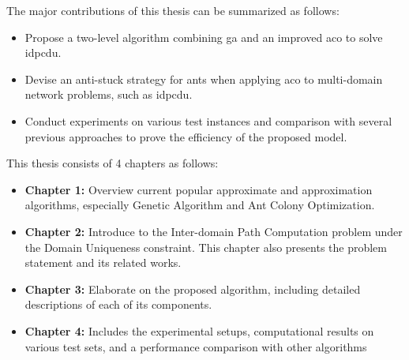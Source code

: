 The major contributions of this thesis can be summarized as follows:
\begin{itemize}
	\item Propose a two-level algorithm combining \gls{ga} and an improved \gls{aco} to solve \gls{idpcdu}.
	\item Devise an anti-stuck strategy for ants when applying \gls{aco} to multi-domain network problems, such as \gls{idpcdu}.
	\item Conduct experiments on various test instances and comparison with several previous approaches to prove the efficiency of the proposed model.
\end{itemize}

This thesis consists of 4 chapters as follows:
\begin{itemize}
	\item \textbf{Chapter 1:} Overview current popular approximate and approximation algorithms, especially Genetic Algorithm and Ant Colony Optimization.
	\item \textbf{Chapter 2:} Introduce to the Inter-domain Path Computation problem under the Domain Uniqueness constraint. This chapter also presents the problem statement and its related works.
	\item \textbf{Chapter 3:} Elaborate on the proposed algorithm, including detailed descriptions of each of its components.
	\item \textbf{Chapter 4:} Includes the experimental setups, computational results on various test sets, and a performance comparison with other algorithms
\end{itemize}

